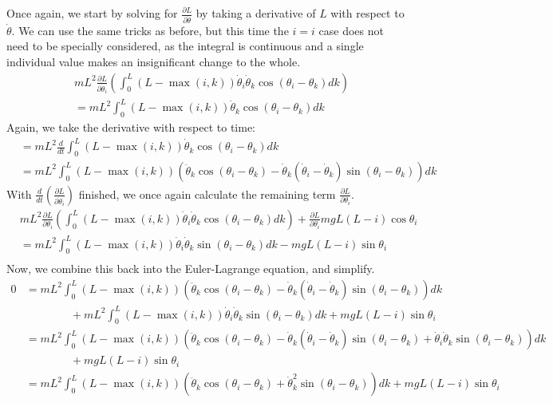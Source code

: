 \documentclass{article}
\begin{document}
Once again, we start by solving for $\frac{\partial L}{\partial \dot \theta}$ by taking a derivative of $L$ with respect to $\dot\theta$. We can use the same tricks as before, but this time the $i=i$ case does not need to be specially considered, as the integral is continuous and a single individual value makes an insignificant change to the whole.
\begin{align*}
&mL^2\frac{\partial L}{\partial \dot \theta_i}\left(\int_0^L(L-\max(i,k))\dot\theta_i\dot\theta_k\cos(\theta_i-\theta_k)dk\right)\\
&= mL^2\int_0^L(L-\max(i,k))\dot\theta_k\cos(\theta_i-\theta_k)dk
\end{align*}
Again, we take the derivative with respect to time:
\begin{align*}
&= mL^2\frac{d}{dt}\int_0^L(L-\max(i,k))\dot\theta_k\cos(\theta_i-\theta_k)dk\\
&= mL^2\int_0^L(L-\max(i,k))\left(\ddot\theta_k\cos(\theta_i-\theta_k)-\dot\theta_k(\dot\theta_i-\dot\theta_k)\sin(\theta_i-\theta_k)\right)dk
\end{align*}
With $\frac{d}{dt}\left(\frac{\partial L}{\partial \dot\theta_i}\right)$ finished, we once again calculate the remaining term $\frac{\partial L}{\partial \theta_i}$.
\begin{align*}
&mL^2\frac{\partial L}{\partial \theta_i}\left(\int_0^L(L-\max(i,k))\dot\theta_i\dot\theta_k\cos(\theta_i-\theta_k)dk\right) + \frac{\partial L}{\partial \theta_i}mgL(L-i)\cos\theta_i\\
&= mL^2\int_0^L(L-\max(i,k))\dot\theta_i\dot\theta_k\sin(\theta_i-\theta_k)dk - mgL(L-i)\sin\theta_i\\
\end{align*}
Now, we combine this back into the Euler-Lagrange equation, and simplify.
\begin{align*}
0&=mL^2\int_0^L(L-\max(i,k))\left(\ddot\theta_k\cos(\theta_i-\theta_k)-\dot\theta_k(\dot\theta_i-\dot\theta_k)\sin(\theta_i-\theta_k)\right)dk\\
&\qquad\qquad+ mL^2\int_0^L(L-\max(i,k))\dot\theta_i\dot\theta_k\sin(\theta_i-\theta_k)dk + mgL(L-i)\sin\theta_i\\
&=mL^2\int_0^L(L-\max(i,k))\left(\ddot\theta_k\cos(\theta_i-\theta_k)-\dot\theta_k(\dot\theta_i-\dot\theta_k)\sin(\theta_i-\theta_k) + \dot\theta_i\dot\theta_k\sin(\theta_i-\theta_k)\right)dk\\
&\qquad\qquad+ mgL(L-i)\sin\theta_i\\
&=mL^2\int_0^L(L-\max(i,k))\left(\ddot\theta_k\cos(\theta_i-\theta_k)+\dot\theta_k^2\sin(\theta_i-\theta_k)\right)dk+ mgL(L-i)\sin\theta_i\\
\end{align*}
\end{document}
